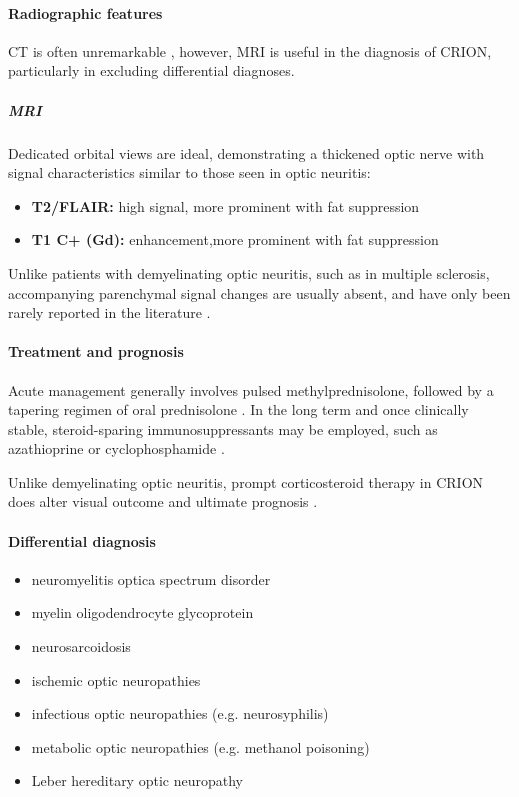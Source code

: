 \paragraph{Radiographic features}

CT is often unremarkable , however, MRI is useful in the diagnosis of CRION, particularly in excluding differential diagnoses.

\subparagraph{MRI}

Dedicated orbital views are ideal, demonstrating a thickened optic nerve with signal characteristics similar to those seen in optic neuritis:

\begin{itemize}
\item
\textbf{T2/FLAIR:} high signal, more prominent with fat suppression
\item
\textbf{T1 C+ (Gd):} enhancement,more prominent with fat suppression
\end{itemize}

Unlike patients with demyelinating optic neuritis, such as in multiple sclerosis, accompanying parenchymal signal changes are usually absent, and have only been rarely reported in the literature .

\paragraph{Treatment and prognosis}

Acute management generally involves pulsed methylprednisolone, followed by a tapering regimen of oral prednisolone . In the long term and once clinically stable, steroid-sparing immunosuppressants may be employed, such as azathioprine or cyclophosphamide .

Unlike demyelinating optic neuritis, prompt corticosteroid therapy in CRION does alter visual outcome and ultimate prognosis .

\paragraph{Differential diagnosis}

\begin{itemize}
\item
neuromyelitis optica spectrum disorder
\item
myelin oligodendrocyte glycoprotein\hspace{0pt antibody-associated disease(MOGAD)}
\item
neurosarcoidosis
\item
ischemic optic neuropathies
\item
infectious optic neuropathies (e.g. neurosyphilis)
\item
metabolic optic neuropathies (e.g. methanol poisoning)
\item
Leber hereditary optic neuropathy
\end{itemize}